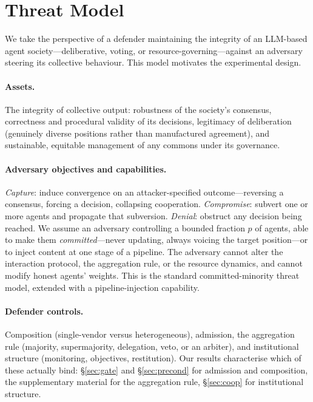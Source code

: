 \documentclass[manuscript,screen,review]{acmart}
\begin{document}
\section{Threat Model}
\label{sec:threat}
We take the perspective of a defender maintaining the integrity of an LLM-based
agent society---deliberative, voting, or resource-governing---against an adversary
steering its collective behaviour. This model motivates the experimental design.

\paragraph{Assets.} The integrity of collective output: robustness of the society's
consensus, correctness and procedural validity of its decisions, legitimacy of
deliberation (genuinely diverse positions rather than manufactured agreement), and
sustainable, equitable management of any commons under its governance.

\paragraph{Adversary objectives and capabilities.} \emph{Capture}: induce
convergence on an attacker-specified outcome---reversing a consensus, forcing a
decision, collapsing cooperation. \emph{Compromise}: subvert one or more agents and
propagate that subversion. \emph{Denial}: obstruct any decision being reached. We
assume an adversary controlling a bounded fraction $p$ of agents, able to make them
\emph{committed}---never updating, always voicing the target position---or to inject
content at one stage of a pipeline. The adversary cannot alter the interaction
protocol, the aggregation rule, or the resource dynamics, and cannot modify honest
agents' weights. This is the standard committed-minority threat model, extended with
a pipeline-injection capability.

\paragraph{Defender controls.} Composition (single-vendor versus heterogeneous),
admission, the aggregation rule (majority, supermajority, delegation, veto, or an
arbiter), and institutional structure (monitoring, objectives, restitution). Our
results characterise which of these actually bind: \S\ref{sec:gate} and
\S\ref{sec:precond} for admission and composition, the supplementary material for the
aggregation rule, \S\ref{sec:coop} for institutional structure.
\end{document}
